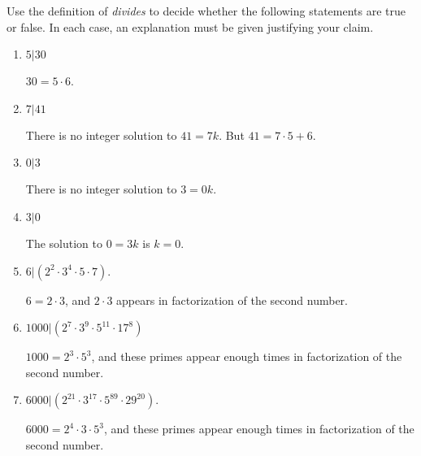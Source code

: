 \documentclass[nooutcomes]{ximera}
\begin{document}
\begin{problem}
Use the definition of \textit{divides} to decide whether the
  following statements are true or false. In each case, an explanation must 
be given justifying your claim.
\begin{enumerate}
\item $5|30$  
  \begin{hint}$30=5\cdot6$.\end{hint}
\item $7|41$  
  \begin{hint}There is no integer solution to $41=7k$.  But $41=7\cdot5+6$. \end{hint}
\item $0|3$  
  \begin{hint}There is no integer solution to $3=0k$.\end{hint}
\item $3|0$ 
  \begin{hint}The solution to $0=3k$ is $k=0$.\end{hint}
\item $6|(2^2\cdot 3^4\cdot 5 \cdot 7)$. 
  \begin{hint} $6=2\cdot3$, and $2\cdot3$ appears in factorization of the second number.\end{hint}
\item $1000|(2^7\cdot 3^9\cdot 5^{11}\cdot 17^8)$ 
  \begin{hint} $1000 = 2^3\cdot5^3$, and these primes appear enough times in factorization of the second number.\end{hint}
\item $6000|(2^{21}\cdot 3^{17}\cdot 5^{89}\cdot 29^{20})$. 
  \begin{hint} $6000 = 2^4\cdot3\cdot5^3$, and these primes appear enough times in factorization of the second number.\end{hint}
\end{enumerate}
\end{problem}
\end{document}
